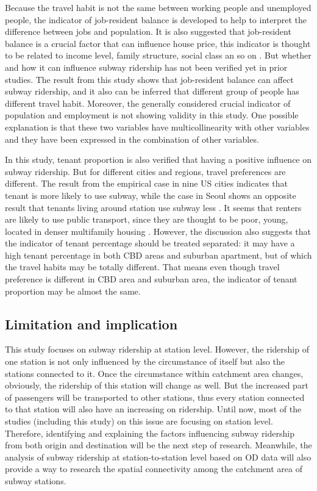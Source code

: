 \documentclass[utf8]{article}
\begin{document}
%
Because the travel habit is not the same between working people and unemployed people, the indicator of job-resident balance is developed to help to interpret the difference between jobs and population. It is also suggested that job-resident balance is a crucial factor that can influence house price, this indicator is thought to be related to income level, family structure, social class an so on \cite{Song2004}. But whether and how it can influence subway ridership has not been verified yet in prior studies. The result from this study shows that job-resident balance can affect subway ridership, and it also can be inferred that different group of people has different travel habit. Moreover, the generally considered crucial indicator of population and employment is not showing validity in this study. One possible explanation is that these two variables have multicollinearity with other variables and they have been expressed in the combination of other variables.

%
In this study, tenant proportion is also verified that having a positive influence on subway ridership. But for different cities and regions, travel preferences are different. The result from the empirical case in nine US cities indicates that tenant is more likely to use subway, while the case in Seoul shows an opposite result that tenants living around station use subway less \cite{Jun2015,Kuby2004}. It seems that renters are likely to use public transport, since they are thought to be poor, young, located in denser multifamily housing \cite{Kuby2004}. However, the discussion also suggests that the indicator of tenant percentage should be treated separated: it may have a high tenant percentage in both CBD areas and suburban apartment, but of which the travel habits may be totally different. That means even though travel preference is different in CBD area and suburban area, the indicator of tenant proportion may be almost the same.

%
\subsection{Limitation and implication}
\indent

This study focuses on subway ridership at station level. However, the ridership of one station is not only influenced by the circumstance of itself but also the stations connected to it. Once the circumstance within catchment area changes, obviously, the ridership of this station will change as well. But the increased part of passengers will be transported to other stations, thus every station connected to that station will also have an increasing on ridership. Until now, most of the studies (including this study) on this issue are focusing on station level. Therefore, identifying and explaining the factors influencing subway ridership from both origin and destination will be the next step of research. Meanwhile, the analysis of subway ridership at station-to-station level based on OD data will also provide a way to research the spatial connectivity among the catchment area of subway stations.
\end{document}
